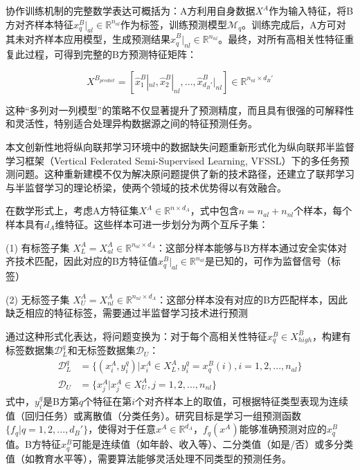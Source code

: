 协作训练机制的完整数学表达可概括为：A方利用自身数据$X^A$作为输入特征，将B方对齐样本特征$x^B_q|_{al} \in \mathbb{R}^{n_{al}}$作为标签，训练预测模型$\mathcal{M}_q$。训练完成后，A方可对其未对齐样本应用模型，生成预测结果$\hat{x}^B_q|_{nl} \in \mathbb{R}^{n_{nl}}$。最终，对所有高相关性特征重复此过程，可得到完整的B方预测特征矩阵：

\begin{equation}
	X^{B_{predict}} = [\hat{x}^B_1|_{nl}, \hat{x}^B_2|_{nl}, ..., \hat{x}^B_{d_B'}|_{nl}] \in \mathbb{R}^{n_{nl} \times d_B'}
\end{equation}

这种“多列对一列模型”的策略不仅显著提升了预测精度，而且具有很强的可解释性和灵活性，特别适合处理异构数据源之间的特征预测任务。

本文创新性地将纵向联邦学习环境中的数据缺失问题重新形式化为纵向联邦半监督学习框架（Vertical Federated Semi-Supervised Learning, VFSSL）下的多任务预测问题。这种重新建模不仅为解决原问题提供了新的技术路径，还建立了联邦学习与半监督学习的理论桥梁，使两个领域的技术优势得以有效融合。

在数学形式上，考虑A方特征集$X^A \in \mathbb{R}^{n \times d_A}$，式中包含$n = n_{al} + n_{nl}$个样本，每个样本具有$d_A$维特征。这些样本可进一步划分为两个互斥子集：

(1) 有标签子集 $X^A_{L} = X^A_{al} \in \mathbb{R}^{n_{al} \times d_A}$：这部分样本能够与B方样本通过安全实体对齐技术匹配，因此对应的B方特征值$x^B_q|_{al} \in \mathbb{R}^{n_{al}}$是已知的，可作为监督信号（标签）

(2) 无标签子集 $X^A_{U} = X^A_{nl} \in \mathbb{R}^{n_{nl} \times d_A}$：这部分样本没有对应的B方匹配样本，因此缺乏相应的特征标签，需要通过半监督学习技术进行预测

通过这种形式化表达，将问题变换为：对于每个高相关性特征$x^B_q \in X^B_{high}$，构建有标签数据集$\mathcal{D}_L^q$和无标签数据集$\mathcal{D}_U$：
\begin{align}
	\mathcal{D}_{L}^{q} &= \{(x_{i}^{A},y_{i}^{q})|x_{i}^{A}\in X_{L}^{A},y_{i}^{q}=x_{q}^{B}(i),i=1,2,...,{{n}_{al}}\} \\
	{{\mathcal{D}}}_{U} &= \{x_{j}^{A}|x_{j}^{A}\in X_{U}^{A},j=1,2,...,{{n}_{nl}}\}
\end{align}
式中，$y_i^q$是B方第$q$个特征在第$i$个对齐样本上的取值，可根据特征类型表现为连续值（回归任务）或离散值（分类任务）。研究目标是学习一组预测函数$\{f_q | q = 1,2,...,d_B'\}$，使得对于任意$x^A \in \mathbb{R}^{d_A}$，$f_q(x^A)$能够准确预测对应的$x^B_q$值。B方特征$x^B_q$可能是连续值（如年龄、收入等）、二分类值（如是/否）或多分类值（如教育水平等），需要算法能够灵活处理不同类型的预测任务。

